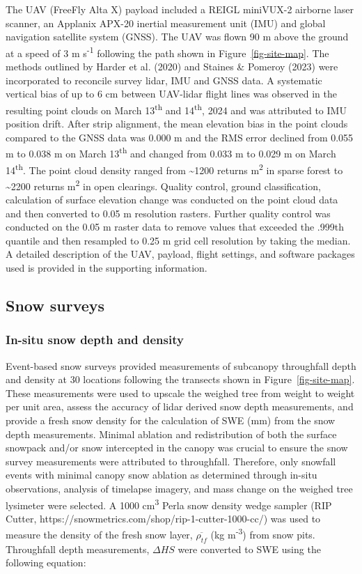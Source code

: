 \documentclass[
  letterpaper,
  DIV=11,
  numbers=noendperiod]{scrartcl}
\begin{document}
The UAV (FreeFly Alta X) payload included a REIGL miniVUX-2 airborne
laser scanner, an Applanix APX-20 inertial measurement unit (IMU) and
global navigation satellite system (GNSS). The UAV was flown 90 m above
the ground at a speed of 3 m s\textsuperscript{-1} following the path
shown in Figure~\ref{fig-site-map}. The methods outlined by Harder et
al. (2020) and Staines \& Pomeroy (2023) were incorporated to reconcile
survey lidar, IMU and GNSS data. A systematic vertical bias of up to 6
cm between UAV-lidar flight lines was observed in the resulting point
clouds on March 13\textsuperscript{th} and 14\textsuperscript{th}, 2024
and was attributed to IMU position drift. After strip alignment, the
mean elevation bias in the point clouds compared to the GNSS data was
0.000 m and the RMS error declined from 0.055 m to 0.038 m on March
13\textsuperscript{th} and changed from 0.033 m to 0.029 m on March
14\textsuperscript{th}. The point cloud density ranged from
\textasciitilde1200 returns m\textsuperscript{2} in sparse forest to
\textasciitilde2200 returns m\textsuperscript{2} in open clearings.
Quality control, ground classification, calculation of surface elevation
change was conducted on the point cloud data and then converted to 0.05
m resolution rasters. Further quality control was conducted on the 0.05
m raster data to remove values that exceeded the .999th quantile and
then resampled to 0.25 m grid cell resolution by taking the median. A
detailed description of the UAV, payload, flight settings, and software
packages used is provided in the supporting information.

\subsection{Snow surveys}\label{snow-surveys}

\subsubsection{In-situ snow depth and
density}\label{in-situ-snow-depth-and-density}

Event-based snow surveys provided measurements of subcanopy throughfall
depth and density at 30 locations following the transects shown in
Figure~\ref{fig-site-map}. These measurements were used to upscale the
weighed tree from weight to weight per unit area, assess the accuracy of
lidar derived snow depth measurements, and provide a fresh snow density
for the calculation of SWE (mm) from the snow depth measurements.
Minimal ablation and redistribution of both the surface snowpack and/or
snow intercepted in the canopy was crucial to ensure the snow survey
measurements were attributed to throughfall. Therefore, only snowfall
events with minimal canopy snow ablation as determined through in-situ
observations, analysis of timelapse imagery, and mass change on the
weighed tree lysimeter were selected. A 1000 cm\textsuperscript{3} Perla
snow density wedge sampler (RIP Cutter,
https://snowmetrics.com/shop/rip-1-cutter-1000-cc/) was used to measure
the density of the fresh snow layer, \(\overline{\rho_{tf}}\) (kg
m\textsuperscript{-3}) from snow pits. Throughfall depth measurements,
\(\Delta HS\) were converted to SWE using the following equation:
\end{document}
